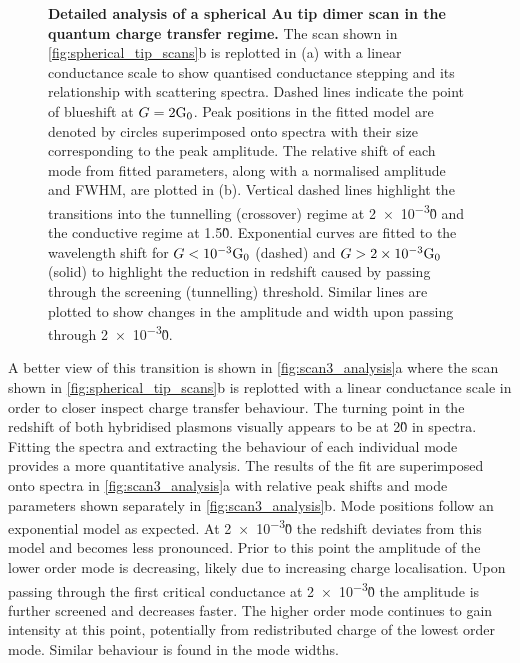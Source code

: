 \documentclass[a4paper, 11pt]{article}
\begin{document}
\begin{figure}[bt]
\caption[Detailed analysis of a spherical Au tip dimer scan in the quantum charge transfer regime]{\textbf{Detailed analysis of a spherical Au tip dimer scan in the quantum charge transfer regime.} The scan shown in \autoref{fig:spherical_tip_scans}b is replotted in (a) with a linear conductance scale to show quantised conductance stepping and its relationship with scattering spectra. Dashed lines indicate the point of blueshift at $G=2\mathrm{G_{0}}$. Peak positions in the fitted model are denoted by circles superimposed onto spectra with their size corresponding to the peak amplitude. The relative shift of each mode from fitted parameters, along with a normalised amplitude and FWHM, are plotted in (b). Vertical dashed lines highlight the transitions into the tunnelling (crossover) regime at \num{2e-3}\G0 and the conductive regime at 1.5\G0. Exponential curves are fitted to the wavelength shift for $G<\num{e-3}\mathrm{G_{0}}$ (dashed) and $G>\num{2e-3}\mathrm{G_{0}}$ (solid) to highlight the reduction in redshift caused by passing through the screening (tunnelling) threshold. Similar lines are plotted to show changes in the amplitude and width upon passing through \num{2e-3}\G0.}
\label{fig:scan3_analysis}
\vspace{-5pt}
\end{figure}

A better view of this transition is shown in \autoref{fig:scan3_analysis}a where the scan shown in \autoref{fig:spherical_tip_scans}b is replotted with a linear conductance scale in order to closer inspect charge transfer behaviour. The turning point in the redshift of both hybridised plasmons visually appears to be at 2\G0 in spectra. Fitting the spectra and extracting the behaviour of each individual mode provides a more quantitative analysis. The results of the fit are superimposed onto spectra in \autoref{fig:scan3_analysis}a with relative peak shifts and mode parameters shown separately in \autoref{fig:scan3_analysis}b. Mode positions follow an exponential model as expected. At \num{2e-3}\G0 the redshift deviates from this model and becomes less pronounced. Prior to this point the amplitude of the lower order mode is decreasing, likely due to increasing charge localisation. Upon passing through the first critical conductance at \num{2e-3}\G0 the amplitude is further screened and decreases faster. The higher order mode continues to gain intensity at this point, potentially from redistributed charge of the lowest order mode. Similar behaviour is found in the mode widths.
\end{document}
